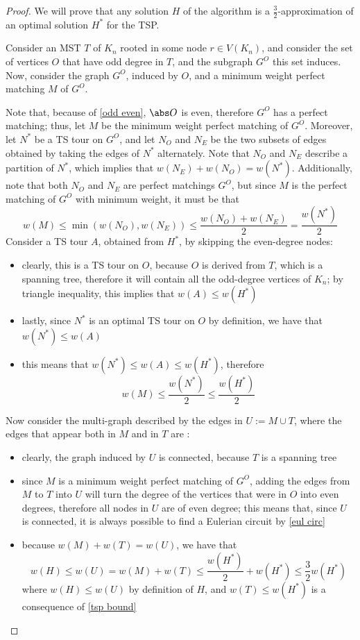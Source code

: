 \documentclass[a4paper, 12pt]{report}
\begin{document}
    \begin{proof}
        We will prove that any solution $H$ of the algorithm is a $\frac{3}{2}$-approximation of an optimal solution $H^*$ for the TSP.

        Consider an MST $T$ of $K_n$ rooted in some node $r \in V(K_n)$, and consider the set of vertices $O$ that have odd degree in $T$, and the subgraph $G^O$ this set induces. Now, consider the graph $G^O$, induced by $O$, and a minimum weight perfect matching $M$ of $G^O$.

        Note that, because of \cref{odd even}, $\abs O$ is even, therefore $G^O$ has a perfect matching; thus, let $M$ be the minimum weight perfect matching of $G^O$. Moreover, let $N^*$ be a TS tour on $G^O$, and let $N_O$ and $N_E$ be the two subsets of edges obtained by taking the edges of $N^*$ alternately. Note that $N_O$ and $N_E$ describe a partition of $N^*$, which implies that $w(N_E) + w(N_O) = w(N^*)$. Additionally, note that both $N_O$ and $N_E$ are perfect matchings $G^O$, but since $M$ is the perfect matching of $G^O$ with minimum weight, it must be that $$w(M) \le \min (w(N_O), w(N_E)) \le \dfrac{w(N_O) + w(N_E)}{2} = \dfrac{w(N^*)}{2}$$ Consider a TS tour $A$, obtained from $H^*$, by skipping the even-degree nodes:

        \begin{itemize}
            \item clearly, this is a TS tour on $O$, because $O$ is derived from $T$, which is a spanning tree, therefore it will contain all the odd-degree vertices of $K_n$; by triangle inequality, this implies that $w(A) \le w(H^*)$
            \item lastly, since $N^*$ is an optimal TS tour on $O$ by definition, we have that $w(N^*) \le w(A)$
            \item this means that $w(N^*) \le w(A) \le w(H^*)$, therefore $$w(M) \le \dfrac{w(N^*)}{2} \le \dfrac{w(H^*)}{2}$$
        \end{itemize}

        Now consider the multi-graph described by the edges in $U := M \cup T$, where the edges that appear both in $M$ and in $T$ are :
        
        \begin{itemize}
            \item clearly, the graph induced by $U$ is connected, because $T$ is a spanning tree
            \item since $M$ is a minimum weight perfect matching of $G^O$, adding the edges from $M$ to $T$ into $U$ will turn the degree of the vertices that were in $O$ into even degrees, therefore all nodes in $U$ are of even degree; this means that, since $U$ is connected, it is always possible to find a Eulerian circuit by \cref{eul circ}
            \item because $w(M) + w(T) = w(U)$, we have that $$w(H) \le w(U) = w(M) + w(T) \le \dfrac{w(H^*)}{2} + w(H^*) \le \dfrac{3}{2}w(H^*)$$ where $w(H) \le w(U)$ by definition of $H$, and $w(T) \le w(H^*)$ is a consequence of \cref{tsp bound}
        \end{itemize}
    \end{proof}
\end{document}
